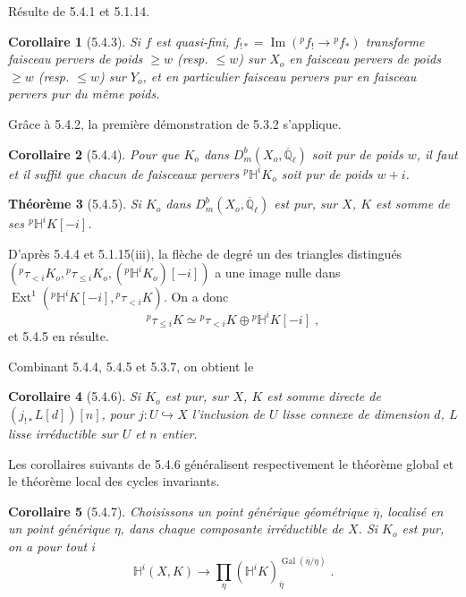 \documentclass[12pt,a4paper]{article}
\theoremstyle{plain}
\newtheorem{theorem}{Th\'eor\`eme}[section]
\newtheorem{corollary}[theorem]{Corollaire}
\theoremstyle{definition}
\theoremstyle{remark}
\DeclareMathOperator{\Ext}{Ext}
\DeclareMathOperator{\Imn}{Im}
\DeclareMathOperator{\Gal}{Gal}
\newcommand{\HH}{\mathbb{H}}
\newcommand{\QQ}{\mathbb{Q}}
\begin{document}
R\'esulte de 5.4.1 et 5.1.14.

\begin{corollary}[5.4.3]
Si $f$ est quasi-fini, $f_{!*} = \Imn({}^{p}f_! \to {}^{p}f_*)$ transforme faisceau pervers de poids $\geq w$ (resp. $\leq w$) sur $X_o$ en faisceau pervers de poids $\geq w$ (resp. $\leq w$) sur $Y_o$, et en particulier faisceau pervers pur en faisceau pervers pur du m\^eme poids.
\end{corollary}

Gr\^ace \`a 5.4.2, la premi\`ere d\'emonstration de 5.3.2 s'applique.

\begin{corollary}[5.4.4]
Pour que $K_o$ dans $D^b_m(X_o, \overline{\QQ}_{\ell})$ soit pur de poids $w$, il faut et il suffit que chacun de faisceaux pervers ${}^{p}\HH^iK_o$ soit pur de poids $w+i$.
\end{corollary}

\begin{theorem}[5.4.5]
Si $K_o$ dans $D^b_m(X_o, \overline{\QQ}_{\ell})$ est pur, sur $X$, $K$ est somme de ses ${}^{p}\HH^iK[-i]$.
\end{theorem}

D'apr\`es 5.4.4 et 5.1.15(iii), la fl\`eche de degr\'e un des triangles distingu\'es $({}^{p}\tau_{<i}K_o, {}^{p}\tau_{\leq i}K_o, ({}^{p}\HH^iK_o)[-i])$ a une image nulle dans $\Ext^1({}^{p}\HH^iK[-i], {}^{p}\tau_{<i}K)$. On a donc
\[
{}^{p}\tau_{\leq i}K \simeq {}^{p}\tau_{<i}K \oplus {}^{p}\HH^iK[-i]\;,
\]
et 5.4.5 en r\'esulte.

Combinant 5.4.4, 5.4.5 et 5.3.7, on obtient le

\begin{corollary}[5.4.6]
Si $K_o$ est pur, sur $X$, $K$ est somme directe de $(j_{!*}L[d])[n]$, pour $j: U \hookrightarrow X$ l'inclusion de $U$ lisse connexe de dimension $d$, $L$ lisse irr\'eductible sur $U$ et $n$ entier.
\end{corollary}

Les corollaires suivants de 5.4.6 g\'en\'eralisent respectivement le th\'eor\`eme global et le th\'eor\`eme local des cycles invariants.

\begin{corollary}[5.4.7]
Choisissons un point g\'en\'erique g\'eom\'etrique $\overline{\eta}$, localis\'e en un point g\'en\'erique $\eta$, dans chaque composante irr\'eductible de $X$. Si $K_o$ est pur, on a pour tout $i$
\begin{equation}\label{eq:5.4.7.1}
\HH^i(X, K) \longrightarrow \prod_{\eta} (\HH^iK)_{\overline{\eta}}^{\Gal(\overline{\eta}/\eta)}\;.
\end{equation}
\end{corollary}
\end{document}
